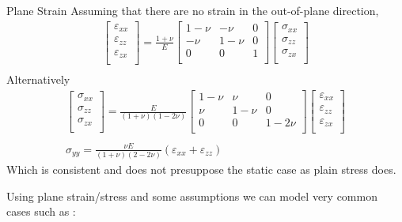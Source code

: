 \documentclass[a4paper, 11pt,article,oneside]{memoir}%
\begin{document}
\begin{eqbox2}{}{Plane Strain}
Assuming that there are no strain in the out-of-plane direction,
\begin{gather*}
\begin{bmatrix}
\varepsilon_{xx}\\
\varepsilon_{zz}\\
\varepsilon_{zx}\\
\end{bmatrix}=\frac{1+\nu}{E}
\begin{bmatrix}
1-\nu&-\nu&0\\
-\nu&1-\nu&0\\
0&0&1\\
\end{bmatrix}
\begin{bmatrix}
\sigma_{xx}\\
\sigma_{zz}\\
\sigma_{zx}\\
\end{bmatrix}\\
\end{gather*}
Alternatively
\begin{gather*}
\begin{bmatrix}
\sigma_{xx}\\
\sigma_{zz}\\
\sigma_{zx}\\
\end{bmatrix}=\frac{E}{(1+\nu)(1-2\nu)}
\begin{bmatrix}
1-\nu&\nu&0\\
\nu&1-\nu&0\\
0&0&1-2\nu\\
\end{bmatrix}
\begin{bmatrix}
\varepsilon_{xx}\\
\varepsilon_{zz}\\
\varepsilon_{zx}\\
\end{bmatrix}\\ \\
\sigma_{yy}=\frac{\nu E}{(1+\nu)(2-2\nu)}(\varepsilon_{xx}+\varepsilon_{zz})
\end{gather*}
Which is consistent and does not presuppose the static case as plain stress does.
\end{eqbox2}

Using plane strain/stress and some assumptions we can model very common cases such as :\\
\end{document}
